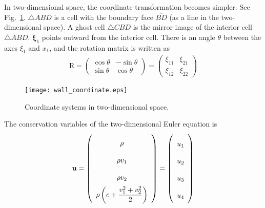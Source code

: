 \documentclass[a4paper,12pt,dvips]{article}
\begin{document}
In two-dimensional space, the coordinate transformation becomes simpler.  See
Fig.~\ref{f:wall_coordinate}.  $\bigtriangleup ABD$ is a cell with the boundary
face $\overline{BD}$ (as a line in the two-dimensional space).  A ghost cell
$\bigtriangleup CBD$ is the mirror image of the interior cell $\bigtriangleup
ABD$.  $\boldsymbol{\xi}_1$ points outward from the interior cell.  There is an
angle $\theta$ between the axes $\xi_1$ and $x_1$, and the rotation matrix is
written as
\begin{align*}
  \mathrm{R} = \left(\begin{array}{cc}
    \cos\theta & -\sin\theta \\
    \sin\theta & \cos\theta
  \end{array}\right)
  = \left(\begin{array}{cc}
    \xi_{11} & \xi_{21} \\
    \xi_{12} & \xi_{22}
  \end{array}\right)
\end{align*}

\begin{figure}[htbp]
\centering
\texttt{[image: wall\_coordinate.eps]}
\caption{Coordinate systems in two-dimensional space.}
\label{f:wall_coordinate}
\end{figure}

The conservation variables of the two-dimensional Euler equation is
\begin{align*}
  \renewcommand{\arraystretch}{2}
  \mathbf{u} = \left(\begin{array}{c}
    \rho \\ \rho v_1 \\ \rho v_2 \\
    \rho\left(e + \dfrac{v_1^2+v_2^2}{2}\right)
  \end{array}\right)
  = \left(\begin{array}{c}
    u_1 \\ u_2 \\ u_3 \\ u_4
  \end{array}\right)
\end{align*}
\end{document}
